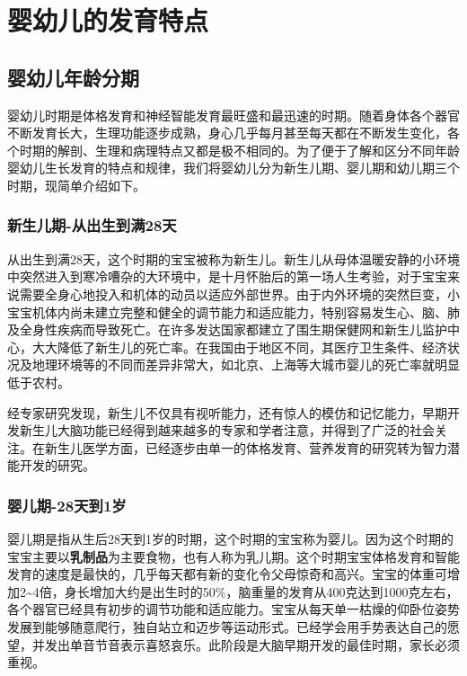 
\chapter{婴幼儿的发育特点}

\section{婴幼儿年龄分期}

婴幼儿时期是体格发育和神经智能发育最旺盛和最迅速的时期。随着身体各个器官不断发育长大，生理功能逐步成熟，身心几乎每月甚至每天都在不断发生变化，各个时期的解剖、生理和病理特点又都是极不相同的。为了便于了解和区分不同年龄婴幼儿生长发育的特点和规律，我们将婴幼儿分为新生儿期、婴儿期和幼儿期三个时期，现简单介绍如下。

\subsection[新生儿期]{新生儿期-\small 从出生到满28天}

从出生到满28天，这个时期的宝宝被称为新生儿。新生儿从母体温暖安静的小环境中突然进入到寒冷嘈杂的大环境中，是十月怀胎后的第一场人生考验，对于宝宝来说需要全身心地投入和机体的动员以适应外部世界。由于内外环境的突然巨变，小宝宝机体内尚未建立完整和健全的调节能力和适应能力，特别容易发生心、脑、肺及全身性疾病而导致死亡。在许多发达国家都建立了围生期保健网和新生儿监护中心，大大降低了新生儿的死亡率。在我国由于地区不同，其医疗卫生条件、经济状况及地理环境等的不同而差异非常大，如北京、上海等大城市婴儿的死亡率就明显低于农村。

经专家研究发现，新生儿不仅具有视听能力，还有惊人的模仿和记忆能力，早期开发新生儿大脑功能已经得到越来越多的专家和学者注意，并得到了广泛的社会关注。在新生儿医学方面，已经逐步由单一的体格发育、营养发育的研究转为智力潜能开发的研究。


\subsection[婴儿期]{婴儿期-\small 28天到1岁}

婴儿期是指从生后28天到1岁的时期，这个时期的宝宝称为婴儿。因为这个时期的宝宝主要以\textbf{乳制品}为主要食物，也有人称为乳儿期。这个时期宝宝体格发育和智能发育的速度是最快的，几乎每天都有新的变化令父母惊奇和高兴。宝宝的体重可增加2\textasciitilde4倍，身长增加大约是出生时的50\%，脑重量的发育从400克达到1000克左右，各个器官已经具有初步的调节功能和适应能力。宝宝从每天单一枯燥的仰卧位姿势发展到能够随意爬行，独自站立和迈步等运动形式。已经学会用手势表达自己的愿望，并发出单音节音表示喜怒哀乐。此阶段是大脑早期开发的最佳时期，家长必须重视。

